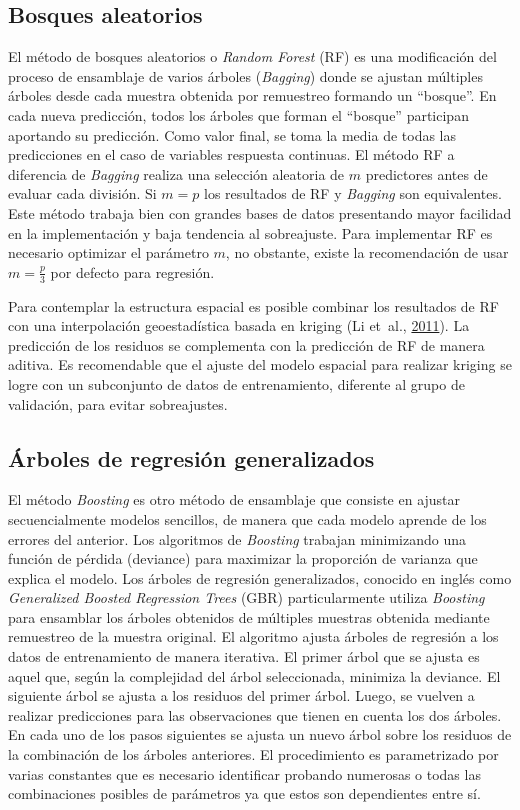 \documentclass[11pt,b5paper,]{krantz}
\begin{document}
\subsection{Bosques aleatorios}\label{bosques-aleatorios}

El método de bosques aleatorios o \emph{Random Forest} (RF) es una
modificación del proceso de ensamblaje de varios árboles
(\emph{Bagging}) donde se ajustan múltiples árboles desde cada muestra
obtenida por remuestreo formando un ``bosque''. En cada nueva
predicción, todos los árboles que forman el ``bosque'' participan
aportando su predicción. Como valor final, se toma la media de todas las
predicciones en el caso de variables respuesta continuas. El método RF a
diferencia de \emph{Bagging} realiza una selección aleatoria de \(m\)
predictores antes de evaluar cada división. Si \(m=p\) los resultados de
RF y \emph{Bagging} son equivalentes. Este método trabaja bien con
grandes bases de datos presentando mayor facilidad en la implementación
y baja tendencia al sobreajuste. Para implementar RF es necesario
optimizar el parámetro \(m\), no obstante, existe la recomendación de
usar \(m=\frac{p}{3}\) por defecto para regresión.

Para contemplar la estructura espacial es posible combinar los
resultados de RF con una interpolación geoestadística basada en kriging
(Li et~al., \protect\hyperlink{ref-Li_Heap_Potter_Daniell_2011}{2011}).
La predicción de los residuos se complementa con la predicción de RF de
manera aditiva. Es recomendable que el ajuste del modelo espacial para
realizar kriging se logre con un subconjunto de datos de entrenamiento,
diferente al grupo de validación, para evitar sobreajustes.

\subsection{Árboles de regresión
generalizados}\label{uxe1rboles-de-regresiuxf3n-generalizados}

El método \emph{Boosting} es otro método de ensamblaje que consiste en
ajustar secuencialmente modelos sencillos, de manera que cada modelo
aprende de los errores del anterior. Los algoritmos de \emph{Boosting}
trabajan minimizando una función de pérdida (deviance) para maximizar la
proporción de varianza que explica el modelo. Los árboles de regresión
generalizados, conocido en inglés como \emph{Generalized Boosted
Regression Trees} (GBR) particularmente utiliza \emph{Boosting} para
ensamblar los árboles obtenidos de múltiples muestras obtenida mediante
remuestreo de la muestra original. El algoritmo ajusta árboles de
regresión a los datos de entrenamiento de manera iterativa. El primer
árbol que se ajusta es aquel que, según la complejidad del árbol
seleccionada, minimiza la deviance. El siguiente árbol se ajusta a los
residuos del primer árbol. Luego, se vuelven a realizar predicciones
para las observaciones que tienen en cuenta los dos árboles. En cada uno
de los pasos siguientes se ajusta un nuevo árbol sobre los residuos de
la combinación de los árboles anteriores. El procedimiento es
parametrizado por varias constantes que es necesario identificar
probando numerosas o todas las combinaciones posibles de parámetros ya
que estos son dependientes entre sí.
\end{document}
